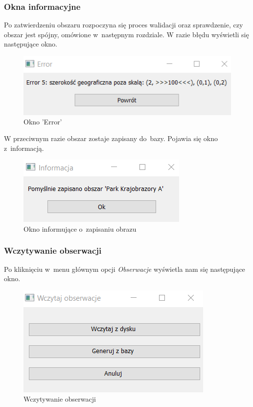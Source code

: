 \documentclass{article}
\begin{document}
\newpage\subsubsection{Okna informacyjne} Po zatwierdzeniu obszaru rozpoczyna się proces walidacji oraz sprawdzenie, czy obszar jest spójny, omówione w~następnym rozdziale. W razie błędu wyświetli się następujące okno.
 
\begin{figure}[h] 
\begin{center}
\includegraphics[scale = 1]{"error5.png"}
\end{center}
\caption{Okno 'Error'}
\label{}
\end{figure}

W przeciwnym razie obszar zostaje zapisany do~bazy. Pojawia się okno z~informacją.

\begin{figure}[h] 
\begin{center}
\includegraphics[scale = 1]{"Zapisano.png"}
\end{center}
\caption{Okno informujące o~zapisaniu obrazu}
\label{}
\end{figure}


\subsubsection{Wczytywanie obserwacji}
Po kliknięciu w~menu głównym opcji \textit{Obserwacje} wyświetla nam się następujące okno.

\begin{figure}[h] 
\begin{center}
\includegraphics[scale = 1]{"wczytajobs.png"}
\end{center}
\caption{Wczytywanie obserwacji}
\label{}
\end{figure}
\newpage
\end{document}
